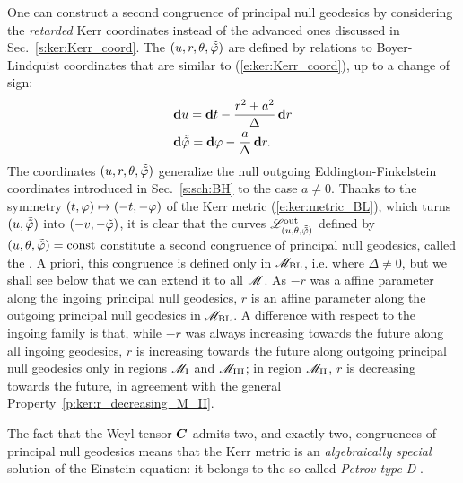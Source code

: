 One can construct a second congruence of principal null geodesics by considering
the \emph{retarded} Kerr coordinates instead of the advanced ones
discussed in Sec.~\ref{s:ker:Kerr_coord}. The
$(u,r,\theta,\tilde{{\tilde\varphi}})$ are defined by relations to Boyer-Lindquist
coordinates that are similar to
(\ref{e:ker:Kerr_coord}), up to a change of sign:
\begin{subequations}
\label{e:ker:out_Kerr_coord}
\begin{align}
& \mathbf{d} u = \mathbf{d} t - \frac{r^2+a^2}{\Delta} \, \mathbf{d} r \\
& \mathbf{d} \tilde{{\tilde\varphi}} = \mathbf{d} \varphi - \frac{a}{\Delta}\, \mathbf{d} r .
\end{align}
\end{subequations}
The coordinates $(u,r,\theta,\tilde{{\tilde\varphi}})$ generalize the null
outgoing Eddington-Finkelstein
coordinates introduced in Sec.~\ref{s:sch:BH} to the case $a\not=0$.
Thanks to the symmetry $(t,\varphi)\mapsto(-t,-\varphi)$ of the Kerr metric (\ref{e:ker:metric_BL}), which turns $(u,\tilde{{\tilde\varphi}})$ into $(-v,-{\tilde\varphi})$, it is clear that the
curves $\mathscr{L}^{\rm out}_{(u,\theta,\tilde{{\tilde\varphi}})}$
defined by $(u,\theta,\tilde{{\tilde\varphi}})=\mathrm{const}$ constitute a second
congruence of principal null geodesics, called the .
A priori, this congruence is defined only in $\mathscr{M}_{\rm BL}$, i.e. where $\Delta\neq 0$,
but we shall see below that we can extend it to all $\mathscr{M}$.
As $-r$ was a affine parameter along
the ingoing principal null geodesics, $r$ is an affine parameter along
the outgoing principal null geodesics in $\mathscr{M}_{\rm BL}$.
A difference with respect to the ingoing family is that, while $-r$ was always
increasing towards the future along all ingoing geodesics,
 $r$ is increasing towards the future
along outgoing principal null geodesics only in regions
$\mathscr{M}_{\rm I}$ and $\mathscr{M}_{\rm III}$; in region $\mathscr{M}_{\rm II}$,
$r$ is decreasing towards the future, in agreement with the general
Property~\ref{p:ker:r_decreasing_M_II}.

The fact that the Weyl tensor $\bm{C}$
admits two, and exactly two, congruences of principal null geodesics
means that the Kerr metric is an \emph{algebraically special} solution of
the Einstein equation: it belongs to the so-called \emph{Petrov type D}
\cite{ONeil95}.

